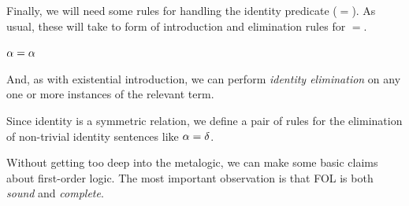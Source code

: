 Finally, we will need some rules for handling the identity predicate ($=$). As
usual, these will take to form of introduction and elimination rules for $=$.

\begin{fitchrule}[Identity Introduction ($=$I)]
  \label{def:identity-introduction-rule}
  \leavevmode
  \vspace{-0.9\baselineskip}
  \begin{fitchproof}
     {$\alpha=\alpha$} 
  \end{fitchproof}
\end{fitchrule}

And, as with existential introduction, we can perform \emph{identity
elimination} on any one or more instances of the relevant term.

\begin{fitchrule}[Leibniz's Law ($=$E)]
  \label{def:identity-elimination-rule}
  Since identity is a symmetric relation, we define a pair of rules for the
  elimination of non-trivial identity sentences like $\alpha=\delta$. \\
  \leavevmode
  \vspace{-0.9\baselineskip}
\end{fitchrule}




Without getting too deep into the metalogic, we can make some basic claims about
first-order logic. The most important observation is that FOL is both
\emph{sound} and \emph{complete}.

